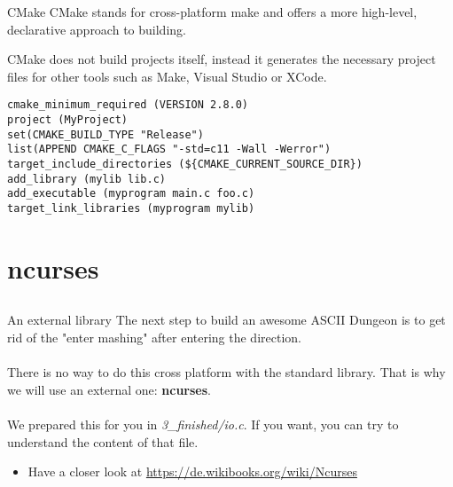 \begin{frame}[fragile]{CMake}
	CMake stands for cross-platform make and offers a more high-level, declarative approach to building.

	CMake does not build projects itself, instead it generates the necessary project files for other tools such as Make, Visual Studio or XCode.

	\begin{lstlisting}[escapeinside=§]
cmake_minimum_required (VERSION 2.8.0)
project (MyProject)
set(CMAKE_BUILD_TYPE "Release")
list(APPEND CMAKE_C_FLAGS "-std=c11 -Wall -Werror")
target_include_directories (${CMAKE_CURRENT_SOURCE_DIR})
add_library (mylib lib.c)
add_executable (myprogram main.c foo.c)
target_link_libraries (myprogram mylib)
\end{lstlisting}
\end{frame}

\section{ncurses}
\subsection{}

\begin{frame}{An external library}
	The next step to build an awesome ASCII Dungeon is to get rid of the "enter mashing" after entering the direction.\\\ \\
	There is no way to do this cross platform with the standard library. That is why we will use an external one: \textbf{ncurses}.\\\ \\
	We prepared this for you in \textit{3\_finished/io.c}. If you want, you can try to understand the content of that file.
	\begin{itemize}
		\item Have a closer look at \url{https://de.wikibooks.org/wiki/Ncurses}
	\end{itemize}

\end{frame}



